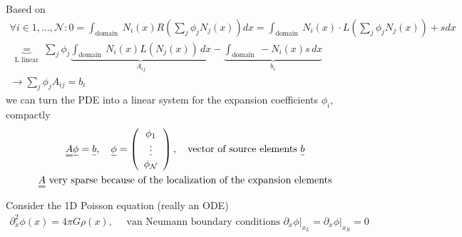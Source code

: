 Based on
\begin{equation}
    \begin{gathered}
        \forall i \in 1,\dots,\mathcal{N}: 0 = \int_{\text {domain }} N_i(x) R\left(\sum_j \phi_j N_j(x)\right) d x=\int_{\text {domain }} N_i(x) \cdot L\left(\sum_j \phi_j N_j(x)\right) +s d x \\
        \underbrace{=}_\text { L linear } \sum_j \phi_j \underbrace{\int_{\text {domain }} N_i(x) L\left(N_j(x)\right) \, d x}_{A_{ij}}-\underbrace{\int_{\text {domain }}-N_i(x) s \, d x}_{b_i} \\
        \rightarrow \sum_j \phi_j A_{ij} = b_i
    \end{gathered}
\end{equation}
we can turn the PDE into a linear system for the expansion coefficients $\phi_i$, compactly
\begin{equation}
    \begin{gathered}
        \mat{A} \vec{\phi} = \vec{b}, \quad \vec{\phi} = \left( \begin{array}{c} \phi_1 \\ \vdots \\ \phi_{\mathcal{N}}\end{array} \right), \quad \text{vector of source elements } \vec{b} \\
        \mat{A} \text{ very sparse because of the localization of the expansion elements}
    \end{gathered}
\end{equation}



Consider the 1D Poisson equation (really an ODE)
\begin{equation}
    \begin{gathered}
        \partial_x^2 \phi(x)=4 \pi G \rho(x), \quad \text { van Neumann boundary conditions }\left.\partial_x \phi\right|_{x_L}=\left.\partial_x \phi\right|_{x_R}=0
    \end{gathered}
\end{equation}


